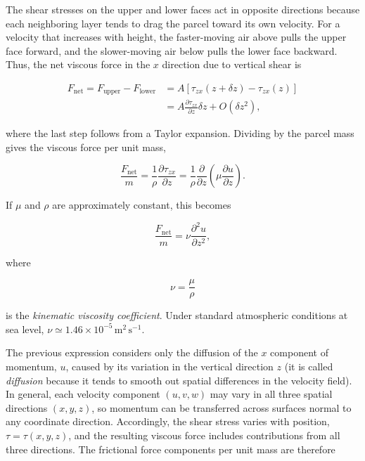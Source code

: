 \documentclass[10pt,twocolumn]{memoir}
\begin{document}
The shear stresses on the upper and lower faces act in opposite directions because each neighboring layer tends to drag the parcel toward its own velocity. For a velocity that increases with height, the faster-moving air above pulls the upper face forward, and the slower-moving air below pulls the lower face backward. Thus, the net viscous force in the $x$ direction due to vertical shear is

\begin{equation}
\begin{aligned}
    F_{\mathrm{net}}
    = F_\mathrm{upper} - F_\mathrm{lower} &= A\left[\tau_{zx}(z+\delta z) - \tau_{zx}(z)\right] \\
    &= A\frac{\partial \tau_{zx}}{\partial z}\delta z + O(\delta z^2),
\end{aligned}
\end{equation}

where the last step follows from a Taylor expansion. Dividing by the parcel mass gives the viscous force per unit mass,

\begin{equation}
    \frac{F_{\mathrm{net}}}{m} = \frac{1}{\rho}\frac{\partial \tau_{zx}}{\partial z} = \frac{1}{\rho}\frac{\partial}{\partial z}\left(\mu\frac{\partial u}{\partial z}\right).
\end{equation}

If $\mu$ and $\rho$ are approximately constant, this becomes

\begin{equation}
    \frac{F_{\mathrm{net}}}{m} = \nu\frac{\partial^2 u}{\partial z^2},
\end{equation}

where

\begin{equation}
    \nu = \frac{\mu}{\rho}
\end{equation}

is the \textit{kinematic viscosity coefficient}. Under standard atmospheric conditions at sea level, $\nu \simeq 1.46\times10^{-5}\,\mathrm{m^2\,s^{-1}}$.

The previous expression considers only the diffusion of the $x$ component of momentum, $u$, caused by its variation in the vertical direction $z$ (it is called \textit{diffusion} because it tends to smooth out spatial differences in the velocity field). In general, each velocity component $(u,v,w)$ may vary in all three spatial directions $(x,y,z)$, so momentum can be transferred across surfaces normal to any coordinate direction. Accordingly, the shear stress varies with position, $\tau=\tau(x,y,z)$, and the resulting viscous force includes contributions from all three directions. The frictional force components per unit mass are therefore
\end{document}
